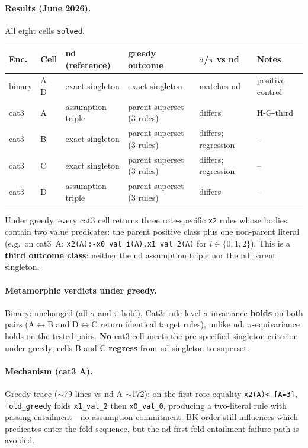 \documentclass[11pt,a4paper]{article}
\begin{document}
\paragraph{Results (June 2026).} All eight cells \texttt{solved}.

\begin{center}
\small
\setlength{\tabcolsep}{4pt}
\begin{tabularx}{\linewidth}{@{}llYYYY@{}}
\toprule
Enc. & Cell & nd (reference) & greedy outcome & $\sigma$/$\pi$ vs nd & Notes \\
\midrule
binary & A--D & exact singleton & exact singleton & matches nd & positive control \\
cat3 & A & assumption triple & parent superset (3 rules) & differs & H-G-third \\
cat3 & B & exact singleton & parent superset (3 rules) & differs; regression & -- \\
cat3 & C & exact singleton & parent superset (3 rules) & differs; regression & -- \\
cat3 & D & assumption triple & parent superset (3 rules) & differs & -- \\
\bottomrule
\end{tabularx}
\end{center}

Under greedy, every cat3 cell returns three rote-specific \texttt{x2} rules whose bodies
contain two value predicates: the parent positive class plus one non-parent literal
(e.g.\ on cat3~A: \texttt{x2(A):-x0\_val\_i(A),x1\_val\_2(A)} for $i\in\{0,1,2\}$).
This is a \textbf{third outcome class}: neither the nd assumption triple nor the nd
parent singleton.

\paragraph{Metamorphic verdicts under greedy.} Binary: unchanged (all $\sigma$ and $\pi$
hold). Cat3: rule-level $\sigma$-invariance \textbf{holds} on both pairs (A$\leftrightarrow$B
and D$\leftrightarrow$C return identical target rules), unlike nd. $\pi$-equivariance holds
on the tested pairs. \textbf{No} cat3 cell meets the pre-specified singleton criterion under
greedy; cells B and C \textbf{regress} from nd singleton to superset.

\paragraph{Mechanism (cat3 A).} Greedy trace (${\sim}$79 lines vs nd A ${\sim}$172): on the
first rote equality \texttt{x2(A)<-[A=3]}, \texttt{fold\_greedy} folds \texttt{x1\_val\_2}
then \texttt{x0\_val\_0}, producing a two-literal rule with passing entailment---no
assumption commitment. BK order still influences which predicates enter the fold sequence,
but the nd first-fold entailment failure path is avoided.
\end{document}
